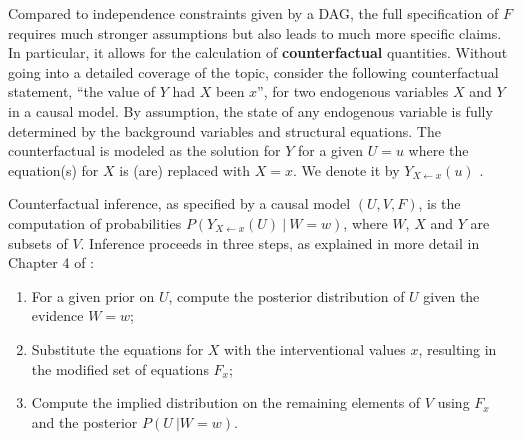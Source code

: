 Compared to independence constraints given by a DAG, the full
specification of $F$ requires much stronger assumptions but also leads
to much more specific claims. In particular, it allows for the
calculation of {\bf counterfactual} quantities. Without going into a
detailed coverage of the topic, consider the following counterfactual
statement, ``the value of $Y$ had $X$ been $x$'', for two endogenous
variables $X$ and $Y$ in a causal model. By assumption, the state of
any endogenous variable is fully determined by
the background variables and structural equations. The counterfactual is
modeled as the solution for $Y$ for a given $U = u$ where the equation(s)
for $X$ is (are) replaced with $X = x$.  We denote it by $Y_{X \leftarrow x}(u)$
\cite{pearl:00}.

Counterfactual inference, as specified by a causal model $(U, V, F)$,
is the computation of probabilities $P(Y_{X \leftarrow x}(U)\ |\ W =
w)$, where $W$, $X$ and $Y$ are subsets of $V$. Inference proceeds in
three steps, as explained in more detail in Chapter 4 of
\cite{pearl:16}:
\begin{enumerate}
\item For a given prior on $U$, compute the posterior distribution of $U$ given the evidence $W = w$;
\item Substitute the equations for $X$ with the interventional values $x$, resulting
     in the modified set of equations $F_x$;
\item Compute the implied distribution on the remaining elements of $V$
     using $F_x$ and the posterior $P(U\ | W = w)$.
\end{enumerate}


